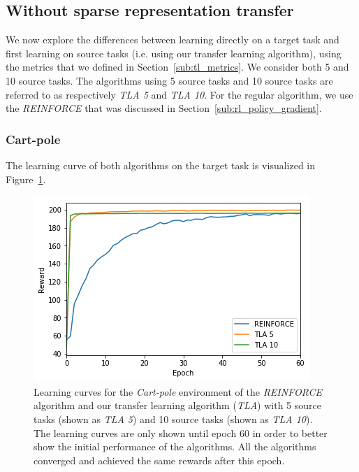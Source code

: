 \subsection{Without sparse representation transfer} %
\label{sub:cartpole:without_sparse_representation_transfer}
We now explore the differences between learning directly on a target task and first learning on source tasks (i.e. using our transfer learning algorithm), using the metrics that we defined in Section~\ref{sub:tl_metrics}.
We consider both 5 and 10 source tasks.
The algorithms using 5 source tasks and 10 source tasks are referred to as respectively \textit{TLA 5} and \textit{TLA 10}.
For the regular algorithm, we use the \textit{REINFORCE} that was discussed in Section~\ref{sub:rl_policy_gradient}.

\subsubsection{Cart-pole} %
\label{ssub:without_sparse_representation_transfer:cartpole}
The learning curve of both algorithms on the target task is visualized in Figure~\ref{fig:CartPole:reward_target_re-akt5-akt10}.
\begin{figure}[htb]
    \centering
    \includegraphics[width=.8\linewidth]{images/results/CartPole/no_sparse_transfer/reward_target_re-akt5-akt10.png}
    \caption[Learning curves for \textit{REINFORCE} and \textit{TLA} for the \emph{Cart-pole} environment]{Learning curves for the \textit{Cart-pole} environment of the \textit{REINFORCE} algorithm and our transfer learning algorithm (\textit{TLA}) with 5 source tasks (shown as \textit{TLA 5}) and 10 source tasks (shown as \textit{TLA 10}). The learning curves are only shown until epoch 60 in order to better show the initial performance of the algorithms. All the algorithms converged and achieved the same rewards after this epoch.}
    \label{fig:CartPole:reward_target_re-akt5-akt10}
\end{figure}
